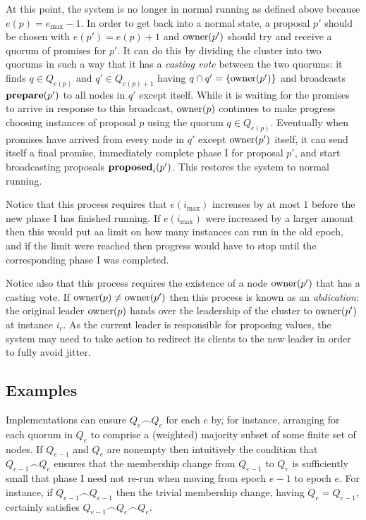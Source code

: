 \documentclass[journal]{IEEEtran}
\begin{document}
At this point, the system is no longer in normal running as defined above
because $e(p) = e_\mathrm{max} - 1$. In order to get back into a normal state,
a proposal $p'$ should be chosen with $e(p') = e(p) + 1$ and $\mathrm{owner}(p')$
should try and receive a quorum of promises for $p'$. It can do this by
dividing the cluster into two quorums in such a way that it has a
\textit{casting vote} between the two quorums: it finds $q \in Q_{e(p)}$ and
$q' \in Q_{e(p)+1}$ having $q \cap q' = \{\mathrm{owner}(p')\}$ and broadcasts
$\mathbf{prepare}(p')$ to all nodes in $q'$ except itself. While it is waiting for the
promises to arrive in response to this broadcast, $\mathrm{owner}(p)$ continues to make
progress choosing instances of proposal $p$ using the quorum $q \in Q_{e(p)}$.
Eventually when promises have arrived from every node in $q'$ except
$\mathrm{owner}(p')$ itself, it can send itself a final promise, immediately complete
phase I for proposal $p'$, and start broadcasting proposals $\mathbf{proposed}_{i}(p')$.
This restores the system to normal running.

Notice that this process requires that $e(i_\mathrm{max})$ increases by at most
$1$ before the new phase I has finished running. If $e(i_\mathrm{max})$ were
increased by a larger amount then this would put aa limit on how many instances
can run in the old epoch, and if the limit were reached then progress would
have to stop until the corresponding phase I was completed.

Notice also that this process requires the existence of a node $\mathrm{owner}(p')$
that has a casting vote. If $\mathrm{owner}(p) \ne \mathrm{owner}(p')$ then this process is
known as an \textit{abdication}: the original leader $\mathrm{owner}(p)$ hands over the
leadership of the cluster to $\mathrm{owner}(p')$ at instance $i_c$.  As the current
leader is responsible for proposing values, the system may need to take action
to redirect its clients to the new leader in order to fully avoid jitter.

\subsection{Examples}\label{types-of-membership-change}

\def\maj#1{\mathbf{maj}(#1)}

Implementations can ensure $Q_e \frown Q_e$ for each $e$ by, for instance,
arranging for each quorum in $Q_e$ to comprise a (weighted) majority subset of
some finite set of nodes.  If $Q_{e-1}$ and $Q_e$ are nonempty then intuitively
the condition that $Q_{e-1} \frown Q_e$ ensures that the membership change from
$Q_{e-1}$ to $Q_e$ is sufficiently small that phase I need not re-run when
moving from epoch $e-1$ to epoch $e$.  For instance, if $Q_{e-1} \frown
Q_{e-1}$ then the trivial membership change, having $Q_e = Q_{e-1}$, certainly
satisfies $Q_{e-1} \frown Q_e \frown Q_e$.
\end{document}
